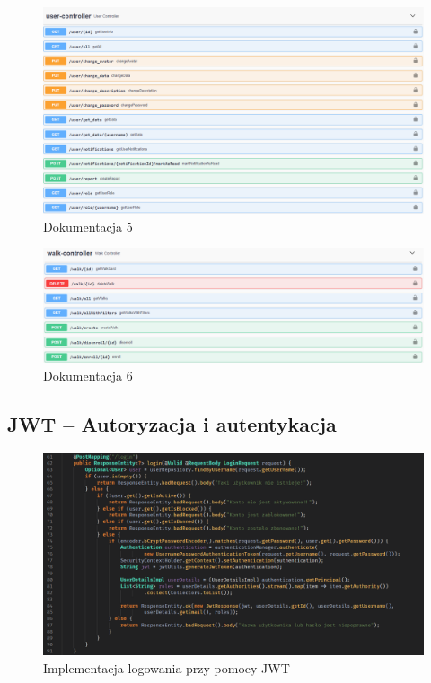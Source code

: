 \begin{figure}[H]
    \centering
    \includegraphics[width=0.7\linewidth]{rysunki/sw-5.PNG}
    \caption{Dokumentacja 5}
    \label{fig:swagger-5}
\end{figure}  
\begin{figure}[H]
    \centering
    \includegraphics[width=0.7\linewidth]{rysunki/sw-6.PNG}
    \caption{Dokumentacja 6}
    \label{fig:swagger-6}
\end{figure}  
\subsection{JWT -- Autoryzacja i autentykacja}
\begin{figure}[H]
  \centering
  \includegraphics[width=1\linewidth]{rysunki/login.PNG}
  \caption{Implementacja logowania przy pomocy JWT}
  \label{fig:JWT}
\end{figure}  

